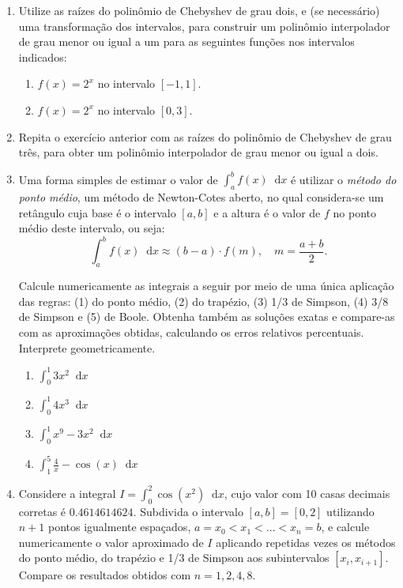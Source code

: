 \documentclass[12pt,a4paper]{article}
\newcommand*\diff{\mathop{}\!\mathrm{d}}
\begin{document}
\begin{enumerate}
\item Utilize as raízes do polinômio de Chebyshev de grau dois, e (se necessário) uma transformação dos intervalos, para construir um polinômio interpolador de grau menor ou igual a um para as seguintes funções nos intervalos indicados:
\begin{multicols}{2}
\begin{enumerate}
   \item $f(x) = 2^x$ no intervalo $[-1, 1]$.
   \item $f(x) = 2^x$ no intervalo $[0, 3]$.
\end{enumerate}
\end{multicols}

\item Repita o exercício anterior com as raízes do polinômio de Chebyshev de grau três, para obter um polinômio interpolador de grau menor ou igual a dois.

\item Uma forma simples de estimar o valor de $\int_a^b f(x)\diff{x}$ é utilizar o \textit{método do ponto médio}, um método de Newton-Cotes aberto, no qual considera-se um retângulo cuja base é o intervalo $[a,b]$ e a altura é o valor de $f$ no ponto médio deste intervalo, ou seja:
\[
\int_a^b f(x)\diff{x} \approx (b-a) \cdot f\left(m \right),
\quad
m = \frac{a+b}{2}.
\]

Calcule numericamente as integrais a seguir por meio de uma única aplicação das regras: (1) do ponto médio, (2) do trapézio, (3) 1/3 de Simpson, (4) 3/8 de Simpson e (5) de Boole. Obtenha também as soluções exatas e compare-as com as aproximações obtidas, calculando os erros relativos percentuais. Interprete geometricamente.
\begin{multicols}{4}
\begin{enumerate}
\item $\int_0^1 3x^2 \diff{x}$
\item $\int_0^1 4x^3 \diff{x}$
\item $\int_{0}^1 x^9 - 3x^2 \diff{x}$
\item $\int_{1}^5 \frac{4}{x} - \cos(x) \diff{x}$
\end{enumerate}
\end{multicols}

\item Considere a integral $I = \int_0^2 \cos(x^2)\diff{x}$, cujo valor com 10 casas decimais corretas é $0.4614614624$. Subdivida o intervalo $[a, b] = [0, 2]$ utilizando $n+1$ pontos igualmente espaçados, $a = x_0 < x_1 < \ldots < x_n = b$, e calcule numericamente o valor aproximado de $I$ aplicando repetidas vezes os métodos do ponto médio, do trapézio e 1/3 de Simpson aos subintervalos $[x_i,x_{i+1}]$. Compare os resultados obtidos com $n = 1, 2, 4, 8$.


\end{enumerate}
\end{document}
